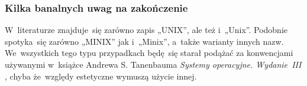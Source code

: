 \documentclass[10pt,t]{beamer}
\begin{document}
\begin{frame}
  \frametitle{Kilka banalnych uwag na zakończenie}


  W~literaturze znajduje~się zarówno zapis „UNIX”, ale też i~„Unix”.
  Podobnie spotyka~się zarówno „MINIX” jak i~„Minix”, a~także warianty
  innych nazw. We~wszystkich tego typu przypadkach będę~się starał podążać
  za konwencjami używanymi w~książce Andrewa S. Tanenbauma \textit{Systemy
    operacyjne. Wydanie~III}
  \parencite{Tannenbaum-Systemy-Operacyjne-Wydanie-III-Pub-2013}, chyba
  że~względy estetyczne wymuszą użycie innej.

\end{frame}



























































\end{document}
